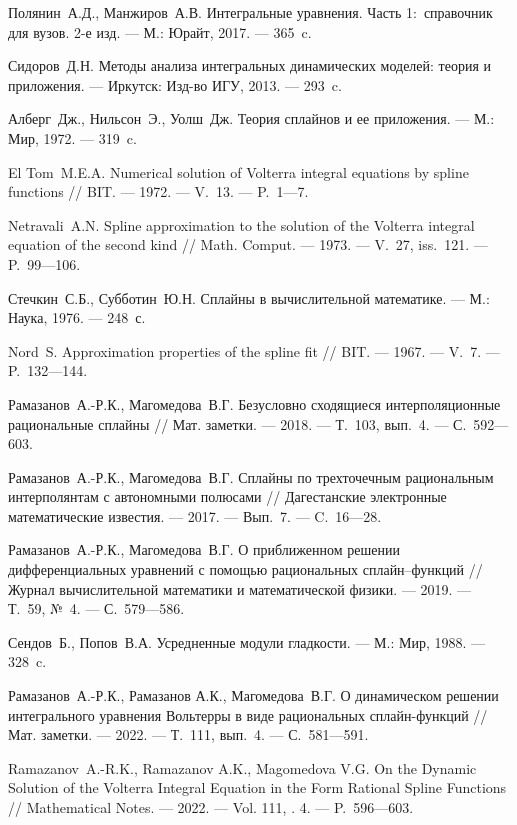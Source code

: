 \begin{thebibliography}{111}
Полянин~А.Д., Манжиров~А.В.
Интегральные уравнения. Часть 1:~справочник для вузов. 2-е изд.
--- М.: Юрайт, 2017.
--- 365~c.

Сидоров~Д.Н.
Методы анализа интегральных динамических моделей: теория и приложения.
--- Иркутск: Изд-во ИГУ, 2013.
--- 293~c.

Алберг~Дж., Нильсон~Э., Уолш~Дж.
Теория сплайнов и ее приложения.
--- М.: Мир, 1972.
--- 319~c.

El Tom~M.E.A.
Numerical solution of Volterra integral equations by spline functions
//
BIT.
--- 1972.
--- V.~13.
--- P.~1---7.

Netravali~A.N.
Spline approximation to the solution of the Volterra integral equation of the second kind
//
Math. Comput.
--- 1973.
--- V.~27, iss.~121.
--- P.~99---106.

Стечкин~С.Б., Субботин~Ю.Н.
Сплайны в вычислительной математике.
--- М.: Наука, 1976.
--- 248~с.

Nord~S.
Approximation properties of the spline fit
//
BIT.
--- 1967.
--- V.~7.
--- P.~132---144.

Рамазанов~А.-Р.К., Магомедова~В.Г.
Безусловно сходящиеся
интерполяционные рациональные сплайны
//
Мат. заметки.
--- 2018.
--- Т.~103, вып.~4.
--- С.~592---603.

Рамазанов~А.-Р.К., Магомедова~В.Г.
Сплайны по трехточечным рациональным интерполянтам с автономными полюсами
//
Дагестанские электронные математические известия.
--- 2017.
--- Вып.~7.
--- C.~16---28.

Рамазанов~А.-Р.К., Магомедова~В.Г.
О приближенном решении дифференциальных уравнений с помощью рациональных сплайн--функций
//
Журнал вычислительной математики и математической физики.
--- 2019.
--- Т.~59, №~4.
--- С.~579---586.

Сендов~Б., Попов~В.А.
Усредненные модули гладкости.
--- М.: Мир, 1988.
--- 328~c.

Рамазанов~А.-Р.К., Рамазанов А.К., Магомедова~В.Г.
О динамическом решении интегрального уравнения Вольтерры в виде рациональных сплайн-функций
//
Мат. заметки.
--- 2022.
--- Т.~111, вып.~4.
--- С.~581---591.

Ramazanov~A.-R.K., Ramazanov A.K., Magomedova V.G.
On the Dynamic Solution of the Volterra Integral Equation in the Form Rational Spline Functions
//
Mathematical Notes.
--- 2022.
--- Vol. 111, \No. 4.
--- P.~596---603.


\end{thebibliography}
